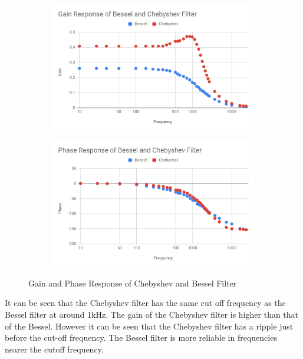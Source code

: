 \documentclass[12pt]{article}
\begin{document}
				\begin{figure}[h!]
			\centering
			\begin{subfigure}[b]{0.45\textwidth}
				\centering
				\includegraphics[width=\textwidth]{chebyshev_gain}
			\end{subfigure}
			\hfill
			\begin{subfigure}[b]{0.45\textwidth}
				\centering
				\includegraphics[width=\textwidth]{chebyshev_phase}
			\end{subfigure}
			\caption{Gain and Phase Response of Chebyshev and Bessel Filter}
		\end{figure}
		
		It can be seen that the Chebyshev filter has the same cut off frequency as the Bessel filter at around 1kHz. The gain of the Chebyshev filter is higher than that of the Bessel. However it can be seen that the Chebyshev filter has a ripple just before the cut-off frequency. The Bessel filter is more reliable in frequencies nearer the cutoff frequency. \\
		
\end{document}
